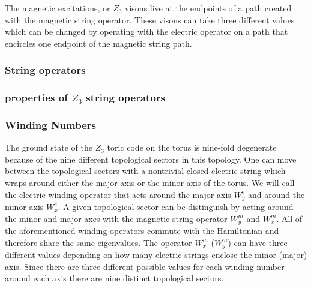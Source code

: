 \documentclass[aps,floatfix,11pt,twocolumn]{revtex4-1}
\begin{document}
            The magnetic excitations, or $Z_3$ visons live at the endpoints of a path created with the magnetic
            string operator. These visons can take three different values which can be changed by
            operating with the electric operator on a path that encircles one endpoint of the
            magnetic string path. 


        \subsubsection{String operators}
    
        \subsubsection{properties of $Z_3$ string operators}

        \subsubsection{Winding Numbers}

            The ground state of the $Z_3$ toric code on the torus is nine-fold degenerate because of
            the nine different topological sectors in this topology. One can move between the
            topological sectors with a nontrivial closed electric string which wraps around either
            the major axis or the minor axis of the torus. We will call the electric winding
            operator that acts around the major axis $W^e_y$ and around the minor axis $W^e_x$.
            A given topological sector can be distinguish 
            by acting around the minor and major axes with the magnetic string operator $W^m_y$ and
            $W^m_x$. All of the aforementioned winding operators commute with the Hamiltonian and
            therefore share the same eigenvalues. The operator $W^m_{x}$ ($W^m_{y}$) can 
            have three different values depending on how many electric strings enclose the minor
            (major) axis. Since there are three different
            possible values for each winding number around each axis there are nine distinct
            topological sectors.
\end{document}
